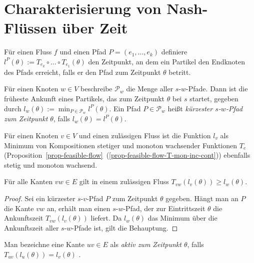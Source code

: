 

\section{Charakterisierung von Nash-Flüssen über Zeit}

\begin{definition}
	Für einen Fluss $f$ und einen Pfad $P=(e_1,\dots,e_k)$ definiere $l^P(\theta):=T_{e_k}\circ\dots\circ T_{e_1}(\theta)$ den Zeitpunkt, an dem ein Partikel den Endknoten des Pfads erreicht, falls er den Pfad zum Zeitpunkt $\theta$ betritt.
	
	Für einen Knoten $w\in V$ beschreibe $\mathcal{P}_w$ die Menge aller $s$-$w$-Pfade.
	Dann ist die früheste Ankunft eines Partikels, das zum Zeitpunkt $\theta$ bei $s$ startet, gegeben durch $l_w(\theta):=\min_{P\in\mathcal{P}_w}l^P(\theta)$.
	Ein Pfad $P\in \mathcal{P}_w$ heißt \emph{kürzester $s$-$w$-Pfad zum Zeitpunkt $\theta$},  falls $l_w(\theta)=l^P(\theta)$.
\end{definition}


Für einen Knoten $v \in V$ und einen zulässigen Fluss ist die Funktion $l_v$ als Minimum von Kompositionen stetiger und monoton wachsender Funktionen $T_e$ (Proposition~\ref{prop-feasible-flow}~(\ref{prop-feasible-flow-T-mon-inc-cont})) ebenfalls stetig und monoton wachsend.


\begin{lemma}\label{lemma-dreicksungl}
	Für alle Kanten $vw\in E$ gilt in einem zulässigen Fluss 
	$T_{vw}(l_v(\theta)) \geq l_w(\theta)$.
\end{lemma}
\begin{proof}
	Sei ein kürzester $s$-$v$-Pfad $P$ zum Zeitpunkt $\theta$ gegeben.
	Hängt man an $P$ die Kante $vw$ an, erhält man einen $s$-$w$-Pfad, der zur Eintrittszeit $\theta$ die Ankunftszeit $T_{vw}(l_v(\theta))$ liefert.
	Da $l_w(\theta)$ das Minimum über die Ankunftszeit aller $s$-$w$-Pfade ist, gilt die Behauptung.
\end{proof}

\begin{definition}
	Man bezeichne eine Kante $uv\in E$ als \emph{aktiv zum Zeitpunkt $\theta$}, falls $T_{uv}(l_u(\theta)) = l_v(\theta)$ .
\end{definition}

